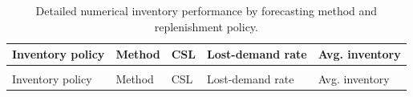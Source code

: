 \documentclass[
  authoryear,
  doubleblind,
  3p]{elsarticle}
\begin{document}
\begin{longtable}{>{\raggedright\arraybackslash}p{7em}>{\raggedright\arraybackslash}p{12em}>{\raggedleft\arraybackslash}p{5em}>{\raggedleft\arraybackslash}p{5em}>{\raggedleft\arraybackslash}p{5em}}

\caption{\label{tbl-num-inv-detailed}Detailed numerical inventory
performance by forecasting method and replenishment policy.}

\tabularnewline

\toprule
Inventory policy & Method & CSL & Lost-demand rate & Avg. inventory\\
\midrule
\endfirsthead
\multicolumn{5}{@{}l}{\textit{(continued)}}\\
\toprule
Inventory policy & Method & CSL & Lost-demand rate & Avg. inventory\\
\midrule
\endhead


\end{longtable}
\end{document}
